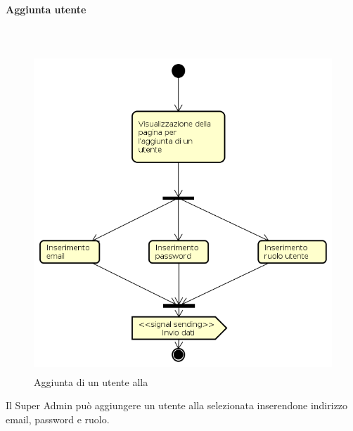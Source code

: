 \paragraph{Aggiunta utente} \mbox{} \\
\begin{figure}[H]
\begin{center}
\includegraphics[height=12cm]{res/sections/backend/activities/aggiuntaUtenteSA.png}
\caption{Aggiunta di un utente alla }
\end{center}
\end{figure}
Il Super Admin può aggiungere un utente alla  selezionata inserendone indirizzo email, password e ruolo. 
